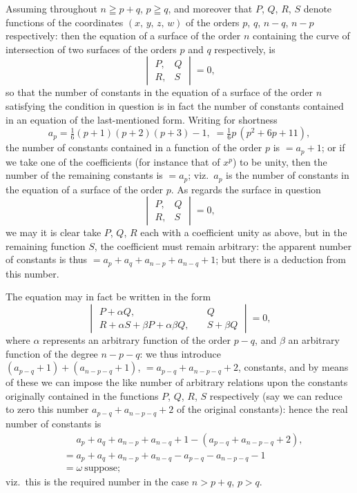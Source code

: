 \documentclass[11pt,a4paper]{book}
\begin{document}
Assuming throughout $n \geqq p+q$, $p \geqq q$, and moreover that $P$, $Q$, $R$, $S$ denote functions of the coordinates $(x,\, y,\, z,\, w)$ of the orders $p$, $q$, $n-q$, $n-p$ respectively: then the equation of a surface of the order $n$ containing the curve of intersection of two surfaces of the orders $p$ and $q$ respectively, is
\[
\begin{vmatrix} P, & Q \\ R, & S \end{vmatrix} = 0,
\]
so that the number of constants in the equation of a surface of the order $n$ satisfying the condition in question is in fact the number of constants contained in an equation of the last-mentioned form. Writing for shortness
\[
a_p = \tfrac{1}{6}(p+1)(p+2)(p+3)-1,\; = \tfrac{1}{6}p\,(p^2+6p+11),
\]
the number of constants contained in a function of the order $p$ is $=a_p+1$; or if we take one of the coefficients (for instance that of $x^p$) to be unity, then the number of the remaining constants is $=a_p$; viz.\ $a_p$ is the number of constants in the equation of a surface of the order $p$. As regards the surface in question
\[
\begin{vmatrix} P, & Q \\ R, & S \end{vmatrix} = 0,
\]
we may it is clear take $P$, $Q$, $R$ each with a coefficient unity as above, but in the remaining function $S$, the coefficient must remain arbitrary: the apparent number of constants is thus $=a_p+a_q+a_{n-p}+a_{n-q}+1$; but there is a deduction from this number.

The equation may in fact be written in the form
\[
\begin{vmatrix} P+\alpha Q, & Q \\ R+\alpha S+\beta P+\alpha\beta Q,\quad & S+\beta Q \end{vmatrix} = 0,
\]
where $\alpha$ represents an arbitrary function of the order $p-q$, and $\beta$ an arbitrary function of the degree $n-p-q$: we thus introduce $(a_{p-q}+1)+(a_{n-p-q}+1)$, $=a_{p-q}+a_{n-p-q}+2$, constants, and by means of these we can impose the like number of arbitrary relations upon the constants originally contained in the functions $P$, $Q$, $R$, $S$ respectively (say we can reduce to zero this number $a_{p-q}+a_{n-p-q}+2$ of the original constants): hence the real number of constants is
\begin{align*}
&\phantom{=} a_p+a_q+a_{n-p}+a_{n-q}+1-(a_{p-q}+a_{n-p-q}+2),\\
&= a_p+a_q+a_{n-p}+a_{n-q}-a_{p-q}-a_{n-p-q}-1\\
&= \omega\ \text{suppose};
\end{align*}
viz.\ this is the required number in the case $n > p+q$, $p > q$.
\end{document}
